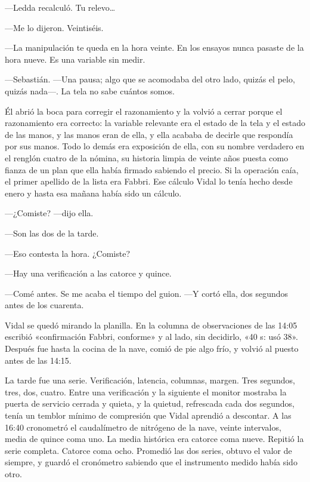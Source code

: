 ---Ledda recalculó. Tu relevo\ldots{}

---Me lo dijeron. Veintiséis.

---La manipulación te queda en la hora veinte. En los ensayos nunca pasaste de la hora nueve. Es una variable sin medir.

---Sebastián. ---Una pausa; algo que se acomodaba del otro lado, quizás el pelo, quizás nada---. La tela no sabe cuántos somos.

Él abrió la boca para corregir el razonamiento y la volvió a cerrar porque el razonamiento era correcto: la variable relevante era el estado de la tela y el estado de las manos, y las manos eran de ella, y ella acababa de decirle que respondía por sus manos. Todo lo demás era exposición de ella, con su nombre verdadero en el renglón cuatro de la nómina, su historia limpia de veinte años puesta como fianza de un plan que ella había firmado sabiendo el precio. Si la operación caía, el primer apellido de la lista era Fabbri. Ese cálculo Vidal lo tenía hecho desde enero y hasta esa mañana había sido un cálculo.

---¿Comiste? ---dijo ella.

---Son las dos de la tarde.

---Eso contesta la hora. ¿Comiste?

---Hay una verificación a las catorce y quince.

---Comé antes. Se me acaba el tiempo del guion. ---Y cortó ella, dos segundos antes de los cuarenta.

Vidal se quedó mirando la planilla. En la columna de observaciones de las 14:05 escribió «confirmación Fabbri, conforme» y al lado, sin decidirlo, «40 s: usó 38». Después fue hasta la cocina de la nave, comió de pie algo frío, y volvió al puesto antes de las 14:15.


\scenebreak


La tarde fue una serie. Verificación, latencia, columnas, margen. Tres segundos, tres, dos, cuatro. Entre una verificación y la siguiente el monitor mostraba la puerta de servicio cerrada y quieta, y la quietud, refrescada cada dos segundos, tenía un temblor mínimo de compresión que Vidal aprendió a descontar. A las 16:40 cronometró el caudalímetro de nitrógeno de la nave, veinte intervalos, media de quince coma uno. La media histórica era catorce coma nueve. Repitió la serie completa. Catorce coma ocho. Promedió las dos series, obtuvo el valor de siempre, y guardó el cronómetro sabiendo que el instrumento medido había sido otro.

